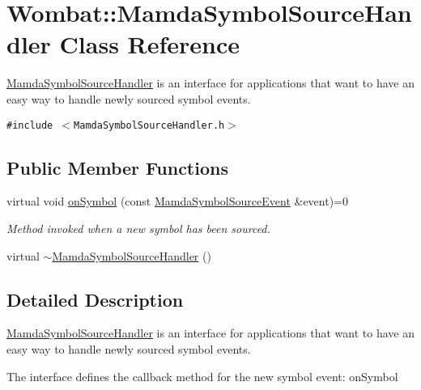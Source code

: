 \hypertarget{classWombat_1_1MamdaSymbolSourceHandler}{
\section{Wombat::Mamda\-Symbol\-Source\-Handler Class Reference}
\label{classWombat_1_1MamdaSymbolSourceHandler}
}
\hyperlink{classWombat_1_1MamdaSymbolSourceHandler}{Mamda\-Symbol\-Source\-Handler} is an interface for applications that want to have an easy way to handle newly sourced symbol events.  


{\tt \#include $<$Mamda\-Symbol\-Source\-Handler.h$>$}

\subsection*{Public Member Functions}
\begin{CompactItemize}
\item 
virtual void \hyperlink{classWombat_1_1MamdaSymbolSourceHandler_228ac54d0c2631e57612efbfa2701128}{on\-Symbol} (const \hyperlink{classWombat_1_1MamdaSymbolSourceEvent}{Mamda\-Symbol\-Source\-Event} \&event)=0
\begin{CompactList}\small\item\em Method invoked when a new symbol has been sourced. \item\end{CompactList}\item 
virtual \hyperlink{classWombat_1_1MamdaSymbolSourceHandler_1725b2e33b959e1c7c1938726d244b5e}{$\sim$Mamda\-Symbol\-Source\-Handler} ()
\end{CompactItemize}


\subsection{Detailed Description}
\hyperlink{classWombat_1_1MamdaSymbolSourceHandler}{Mamda\-Symbol\-Source\-Handler} is an interface for applications that want to have an easy way to handle newly sourced symbol events. 

The interface defines the callback method for the new symbol event: on\-Symbol 



